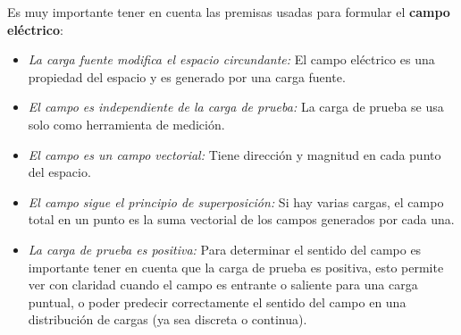 Es muy importante tener en cuenta las premisas usadas para formular el \textbf{campo eléctrico}:
\begin{itemize}
    \item \textit{La carga fuente modifica el espacio circundante:} El campo eléctrico es una propiedad del espacio y es generado por una carga fuente.
    \item \textit{El campo es independiente de la carga de prueba:} La carga de prueba se usa solo como herramienta de medición.
    \item \textit{El campo es un campo vectorial:} Tiene dirección y magnitud en cada punto del espacio.
    \item \textit{El campo sigue el principio de superposición:} Si hay varias cargas, el campo total en un punto es la suma vectorial de los campos generados por cada una.
    \item \textit{La carga de prueba es positiva:} Para determinar el sentido del campo es importante tener en cuenta que la carga de prueba es positiva, esto permite ver con claridad cuando el campo es entrante o saliente para una carga puntual, o poder predecir correctamente el sentido del campo en una distribución de cargas (ya sea discreta o continua).
\end{itemize}